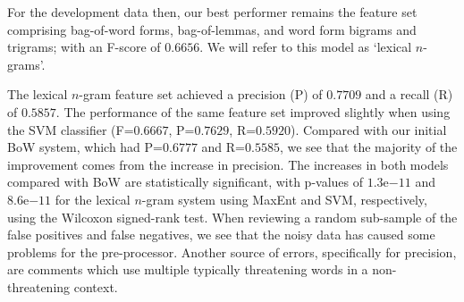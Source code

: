 \documentclass[11pt,letterpaper]{article}
\begin{document}
For the development data then, our best performer remains the feature set comprising bag-of-word forms, bag-of-lemmas, and word form bigrams and trigrams; with an F-score of $0.6656$. We will refer to this model as `lexical $n$-grams'. %







The lexical $n$-gram feature set achieved a precision (P) of $0.7709$ and a recall (R) of $0.5857$. The performance of the same feature set improved slightly when using the SVM classifier (F=$0.6667$, P=$0.7629$, R=$0.5920$).
Compared with our initial BoW system, which had P=$0.6777$ and R=$0.5585$, we see that the majority of the improvement comes from the increase in precision. The increases in both models compared with BoW are statistically significant, with p-values of $1.3\mathrm{e}{-11}$ and $8.6\mathrm{e}{-11}$ for the lexical $n$-gram system using MaxEnt and SVM, respectively, using the Wilcoxon signed-rank test. When reviewing a random sub-sample of the false positives and false negatives, we see that the noisy data has caused some problems for the pre-processor. %
Another source of errors, specifically for precision, are comments which use multiple typically threatening words in a non-threatening context.


      
\end{document}
